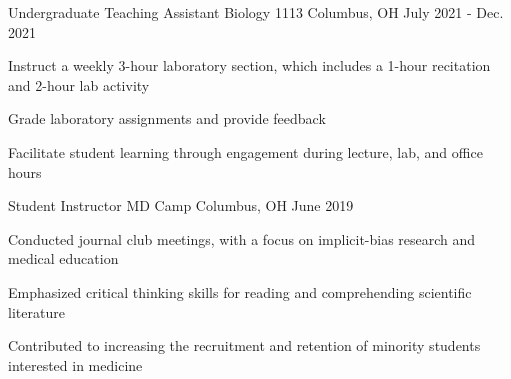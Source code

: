

\begin{cventries}

  \cventry
    {Undergraduate Teaching Assistant} %
    {Biology 1113} %
    {Columbus, OH} %
    {July 2021 - Dec. 2021} %
    {
      \begin{cvitems} %
        \item {Instruct a weekly 3-hour laboratory section, which includes a 1-hour recitation and 2-hour lab activity}
        \item {Grade laboratory assignments and provide feedback}
        \item {Facilitate student learning through engagement during lecture, lab, and office hours}
      \end{cvitems}
    }

  \cventry
    {Student Instructor} %
    {MD Camp} %
    {Columbus, OH} %
    {June 2019} %
    {
      \begin{cvitems} %
        \item {Conducted journal club meetings, with a focus on implicit-bias research and medical education}
        \item {Emphasized critical thinking skills for reading and comprehending scientific literature}
        \item{Contributed to increasing the recruitment and retention of minority students interested in medicine}
      \end{cvitems}
    }
\end{cventries}